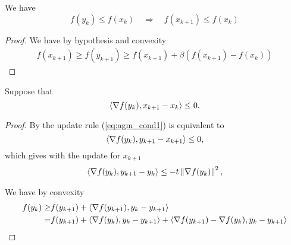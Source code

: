 \documentclass[english,12pt,a4paper]{article}
\begin{document}
\begin{lemma}\label{lemma:agm_mony_monx}
We have
%
\begin{equation}\label{eq:agm_mony_monx}
f(y_{k}) \le  f(x_k)  \quad\Rightarrow\quad f(x_{k+1}) \le  f(x_k)
\end{equation}
%
\end{lemma}
\begin{proof}
We have by hypothesis and convexity
%
\begin{align*}
f(x_{k+1}) \ge f(y_{k+1}) \ge f(x_{k+1}) + \beta( f(x_{k+1}) -  f(x_k))
\end{align*}
%
\end{proof}
%
\begin{lemma}\label{lemma:agm_cond1}
Suppose that
%
\begin{equation}\label{eq:agm_cond1}
\langle\nabla f(y_k),x_{k+1}-x_k\rangle \le 0.
\end{equation}
%
\end{lemma}
%
\begin{proof}
By the update rule (\ref{eq:agm_cond1}) is equivalent to
%
\begin{equation}\label{eq:agm_cond2}
\langle\nabla f(y_k),y_{k+1}-x_{k+1}\rangle \le 0,
\end{equation}
%
which gives with the update for $x_{k+1}$
%
\begin{align*}
\langle\nabla f(y_k),y_{k+1}-y_{k}\rangle \le - t \left\|\nabla f(y_k)\right\|^2,
\end{align*}
%




We have by convexity
%
\begin{align*}
f(y_{k}) \ge&  f(y_{k+1}) + \langle\nabla f(y_{k+1}),y_{k}-y_{k+1}\rangle\\
=& f(y_{k+1}) + \langle\nabla f(y_{k}),y_{k}-y_{k+1}\rangle + \langle\nabla f(y_{k+1})-\nabla f(y_{k}),y_{k}-y_{k+1}\rangle
\end{align*}
%

\end{proof}
\end{document}
